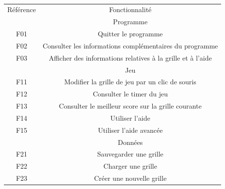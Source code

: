         \paragraph*{}
        \begin{tabular*}{0.75\textwidth}{ c | c }
                Référence & Fonctionnalité\\
                & Programme \\ 
                F01 & Quitter le programme \\
                F02 & Consulter les informations complémentaires du programme \\
                F03 & Afficher des informations relatives à la grille et à l'aide \\
                & Jeu \\ 
                F11 & Modifier la grille de jeu par un clic de souris \\
                F12 & Consulter le timer du jeu \\
                F13 & Consulter le meilleur score sur la grille courante \\
                F14 & Utiliser l'aide \\
                F15 & Utiliser l'aide avancée \\
                & Données \\ 
                F21 & Sauvegarder une grille \\
                F22 & Charger une grille \\
                F23 & Créer une nouvelle grille \\ %
        \end{tabular*}

